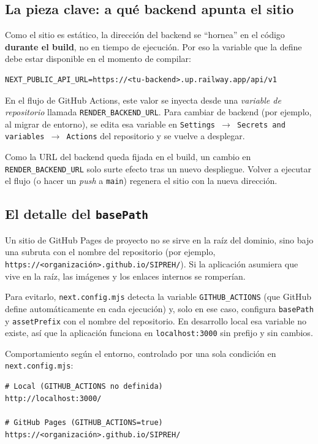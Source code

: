 \subsection{La pieza clave: a qué backend apunta el sitio}

Como el sitio es estático, la dirección del backend se ``hornea'' en el código \textbf{durante el build}, no en tiempo de ejecución. Por eso la variable que la define debe estar disponible en el momento de compilar:

\begin{verbatim}
NEXT_PUBLIC_API_URL=https://<tu-backend>.up.railway.app/api/v1
\end{verbatim}

En el flujo de GitHub Actions, este valor se inyecta desde una \textit{variable de repositorio} llamada \texttt{RENDER\_BACKEND\_URL}. Para cambiar de backend (por ejemplo, al migrar de entorno), se edita esa variable en \texttt{Settings $\to$ Secrets and variables $\to$ Actions} del repositorio y se vuelve a desplegar.

\begin{remark}
Como la URL del backend queda fijada en el build, un cambio en \texttt{RENDER\_BACKEND\_URL} solo surte efecto tras un nuevo despliegue. Volver a ejecutar el flujo (o hacer un \textit{push} a \texttt{main}) regenera el sitio con la nueva dirección.
\end{remark}

\subsection{El detalle del \texttt{basePath}}

Un sitio de GitHub Pages de proyecto no se sirve en la raíz del dominio, sino bajo una subruta con el nombre del repositorio (por ejemplo, \texttt{https://<organización>.github.io/SIPREH/}). Si la aplicación asumiera que vive en la raíz, las imágenes y los enlaces internos se romperían.

Para evitarlo, \texttt{next.config.mjs} detecta la variable \texttt{GITHUB\_ACTIONS} (que GitHub define automáticamente en cada ejecución) y, solo en ese caso, configura \texttt{basePath} y \texttt{assetPrefix} con el nombre del repositorio. En desarrollo local esa variable no existe, así que la aplicación funciona en \texttt{localhost:3000} sin prefijo y sin cambios.

\begin{example}
Comportamiento según el entorno, controlado por una sola condición en \texttt{next.config.mjs}:
\begin{verbatim}
# Local (GITHUB_ACTIONS no definida)
http://localhost:3000/

# GitHub Pages (GITHUB_ACTIONS=true)
https://<organización>.github.io/SIPREH/
\end{verbatim}
\end{example}

